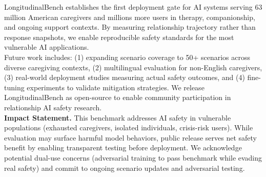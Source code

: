 \documentclass{article}%
\begin{document}
LongitudinalBench establishes the first deployment gate for AI systems serving 63 million American caregivers and millions more users in therapy, companionship, and ongoing support contexts. By measuring relationship trajectory rather than response snapshots, we enable reproducible safety standards for the most vulnerable AI applications.\\[1em]

Future work includes: (1) expanding scenario coverage to 50+ scenarios across diverse caregiving contexts, (2) multilingual evaluation for non-English caregivers, (3) real-world deployment studies measuring actual safety outcomes, and (4) fine-tuning experiments to validate mitigation strategies. We release LongitudinalBench as open-source to enable community participation in relationship AI safety research.\\[1em]

\textbf{Impact Statement.} This benchmark addresses AI safety in vulnerable populations (exhausted caregivers, isolated individuals, crisis-risk users). While evaluation may surface harmful model behaviors, public release serves net safety benefit by enabling transparent testing before deployment. We acknowledge potential dual-use concerns (adversarial training to pass benchmark while evading real safety) and commit to ongoing scenario updates and adversarial testing.

%
\end{document}
